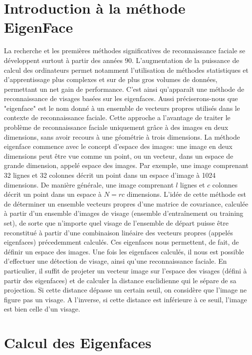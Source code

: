 \documentclass[12pt,french]{article}
\theoremstyle{plain}
\theoremstyle{definition}
\begin{document}
\section{Introduction à la méthode EigenFace}
La recherche et les premières méthodes significatives de reconnaissance faciale se développent surtout à partir des années 90.
L’augmentation de la puissance de calcul des ordinateurs permet notamment l’utilisation de méthodes statistiques et d’apprentissage plus complexes et sur de plus gros volumes de données, permettant un net gain de performance.
C'est ainsi qu'apparaît une méthode de reconnaissance de visages basées sur les eigenfaces.
Aussi préciserons-nous que "eigenface" est le nom donné à un ensemble de vecteurs propres utilisés dans le contexte de reconnaissance faciale.
Cette approche a l'avantage de traiter le problème de reconnaissance faciale uniquement grâce à des images en deux dimensions, sans avoir recours à une géométrie à trois dimensions.
La méthode eigenface commence avec le concept d'espace des images: une image en deux dimensions peut être vue comme un point, ou un vecteur, dans un espace de grande dimension, appelé espace des images.
Par exemple, une image comprenant 32 lignes et 32 colonnes décrit un point dans un espace d'image à 1024 dimensions.
De manière générale, une image comprenant $l$ lignes et $c$ colonnes décrit un point dans un espace à $N = rc$ dimensions.
L'idée de cette méthode est de déterminer un ensemble vecteurs propres d'une matrice de covariance, calculée à partir d'un ensemble d'images de visage (ensemble d'entraînement ou training set), de sorte que n'importe quel visage de l'ensemble de départ puisse être reconstitué à partir d'une combinaison linéaire des vecteurs propres (appelés eigenfaces) précedemment calculés.
Ces eigenfaces nous permettent, de fait, de définir un espace des images.
Une fois les eigenfaces calculés, il nous est possible d'effectuer une détection de visage, ainsi qu'une reconnaissance faciale.
En particulier, il suffit de projeter un vecteur image sur l'espace des visages (défini à partir des eigenfaces) et de calculer la distance euclidienne qui le sépare de sa projection.
Si cette distance dépasse un certain seuil, on considère que l'image ne figure pas un visage. A l'inverse, si cette distance est inférieure à ce seuil, l'image est bien celle d'un visage.

\section{Calcul des Eigenfaces}
\end{document}
